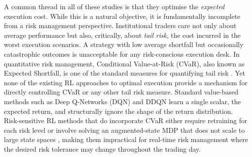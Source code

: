 \documentclass[11pt]{article}
\begin{document}
A common thread in all of these studies is that they optimise the \emph{expected} execution cost. While this is a natural objective, it is fundamentally incomplete from a risk management perspective. Institutional traders care not only about average performance but also, critically, about \emph{tail risk}, the cost incurred in the worst execution scenarios. A strategy with low average shortfall but occasionally catastrophic outcomes is unacceptable for any risk-conscious execution desk. In quantitative risk management, Conditional Value-at-Risk (CVaR), also known as Expected Shortfall, is one of the standard measures for quantifying tail risk \citet{artzner1999coherent, mcneil2015quantitative}. Yet none of the existing RL approaches to optimal execution provide a mechanism for directly controlling CVaR or any other tail risk measure. Standard value-based methods such as Deep Q-Networks (DQN) and DDQN learn a single scalar, the expected return, and structurally ignore the shape of the return distribution. Risk-sensitive RL methods that do incorporate CVaR either require retraining for each risk level \citet{tamar2015optimizing} or involve solving an augmented-state MDP that does not scale to large state spaces \citet{chow2015risk}, making them impractical for real-time risk management where the desired risk tolerance may change throughout the trading day.
 
\end{document}
